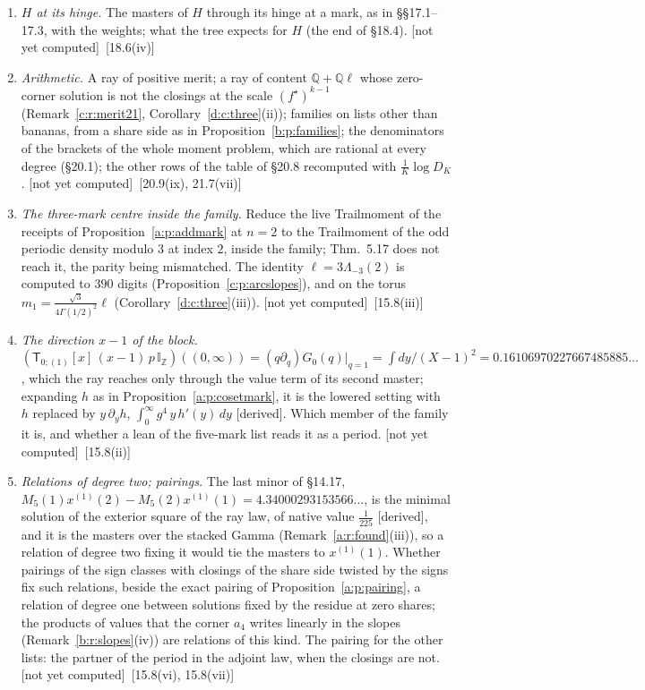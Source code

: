 \documentclass[11pt]{article}
\newcommand{\sT}{\mathsf T}
\newcommand{\IZ}{\mathbb I_{\mathbb Z}}
\newcommand{\Tx}[3]{(\sT_{#1;(1)}[x]\,#2)((#3,\infty))}
\theoremstyle{plain}
\theoremstyle{definition}
\theoremstyle{remark}
\newcommand{\derived}{\textup{[derived]}}
\newcommand{\notyet}{\textup{[not yet computed]}}
\begin{document}
\begin{enumerate}[label=\textbf{O\arabic*},ref=O\arabic*,leftmargin=*,itemsep=4pt]
\item\label{o:Hhinge} \emph{$H$ at its hinge.} The masters of $H$ through its hinge at a mark, as in \S\S17.1--17.3, with the weights; what the tree expects for $H$ (the end of \S18.4). \notyet\ {\small[18.6(iv)]}
\item\label{o:merit} \emph{Arithmetic.} A ray of positive merit; a ray of content $\mathbb Q+\mathbb Q\ell$ whose zero-corner solution is not the closings at the scale $(f^\star)^{k-1}$ (Remark~\ref{c:r:merit21}, Corollary~\ref{d:c:three}(ii)); families on lists other than bananas, from a share side as in Proposition~\ref{b:p:families}; the denominators of the brackets of the whole moment problem, which are rational at every degree (\S20.1); the other rows of the table of \S20.8 recomputed with $\frac1K\log D_K$. \notyet\ {\small[20.9(ix), 21.7(vii)]}
\item\label{o:ell} \emph{The three-mark centre inside the family.} Reduce the live Trailmoment of the receipts of Proposition~\ref{a:p:addmark} at $n=2$ to the Trailmoment of the odd periodic density modulo $3$ at index $2$, inside the family; Thm.~5.17 does not reach it, the parity being mismatched. The identity $\ell=3\Lambda_{-3}(2)$ is computed to $390$ digits (Proposition~\ref{c:p:arcslopes}), and on the torus $m_1=\frac{\sqrt3}{4\Gamma(1/2)^2}\ell$ (Corollary~\ref{d:c:three}(iii)). \notyet\ {\small[15.8(iii)]}
\item\label{o:block} \emph{The direction $x-1$ of the block.} $\Tx{0}{(x-1)\,p\,\IZ}{0}=(q\partial_q)G_0(q)|_{q=1}=\int dy/(X-1)^2=0.16106970227667485885\ldots$, which the ray reaches only through the value term of its second master; expanding $h$ as in Proposition~\ref{a:p:cosetmark}, it is the lowered setting with $h$ replaced by $y\,\partial_yh$, $\int_0^\infty g^4\,y\,h'(y)\,dy$ \derived. Which member of the family it is, and whether a lean of the five-mark list reads it as a period. \notyet\ {\small[15.8(ii)]}
\item\label{o:degtwo} \emph{Relations of degree two; pairings.} The last minor of \S14.17, $M_5(1)x^{(1)}(2)-M_5(2)x^{(1)}(1)=4.34000293153566\ldots$, is the minimal solution of the exterior square of the ray law, of native value $\frac1{225}$ \derived, and it is the masters over the stacked Gamma (Remark~\ref{a:r:found}(iii)), so a relation of degree two fixing it would tie the masters to $x^{(1)}(1)$. Whether pairings of the sign classes with closings of the share side twisted by the signs fix such relations, beside the exact pairing of Proposition~\ref{a:p:pairing}, a relation of degree one between solutions fixed by the residue at zero shares; the products of values that the corner $a_4$ writes linearly in the slopes (Remark~\ref{b:r:slopes}(iv)) are relations of this kind. The pairing for the other lists: the partner of the period in the adjoint law, when the closings are not. \notyet\ {\small[15.8(vi), 15.8(vii)]}

\end{enumerate}
\end{document}
